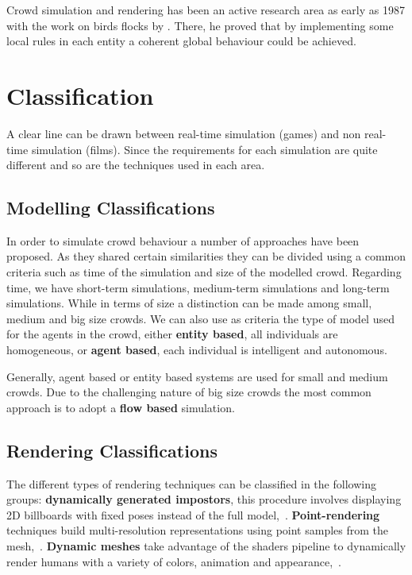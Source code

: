 \documentclass[11pt,twocolumn]{article}
\numberwithin{equation}{section} %
\numberwithin{figure}{section} %
\numberwithin{table}{section} %
\begin{document}
Crowd simulation and rendering has been an active research area as early as 1987 with the work on birds flocks by \cite{Reynolds1987}.
There, he proved that by implementing some local rules in each entity a coherent global behaviour could be achieved.

\section{Classification}

A clear line can be drawn between real-time simulation (games) and non real-time simulation (films).
Since the requirements for each simulation are quite different and so are the techniques used in each area.

\subsection{Modelling Classifications}

In order to simulate crowd behaviour a number of approaches have been proposed.
As they shared certain similarities they can be divided using a common criteria such as time of the simulation and size of the modelled crowd.
Regarding time, we have short-term simulations, medium-term simulations and long-term simulations.
While in terms of size a distinction can be made among small, medium and big size crowds.
We can also use as criteria the type of model used for the agents in the crowd, either \textbf{entity based}, all individuals are homogeneous, or \textbf{agent based}, each individual is intelligent and autonomous.

Generally, agent based or entity based systems are used for small and medium crowds.
Due to the challenging nature of big size crowds the most common approach is to adopt a \textbf{flow based} simulation.

\subsection{Rendering Classifications}

The different types of rendering techniques can be classified in the following groups: 
\textbf{dynamically generated impostors}, this procedure involves displaying 2D billboards with fixed poses instead of the full model,~\cite{Aubel2000}.
\textbf{Point-rendering} techniques build multi-resolution representations using point samples from the mesh,~\cite{Wand2002}.
\textbf{Dynamic meshes} take advantage of the shaders pipeline to dynamically render humans with a variety of colors, animation and appearance,~\cite{Ciechomski2005}.
\end{document}
